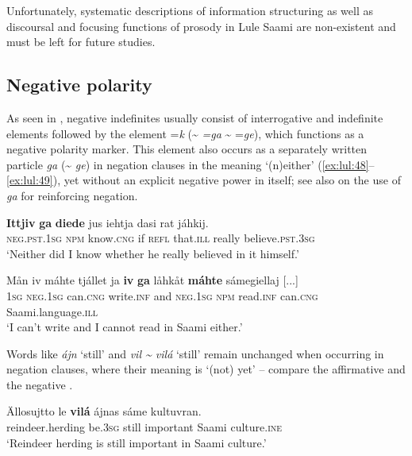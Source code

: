 \documentclass[output=paper,colorlinks,citecolor=brown]{langscibook}
\begin{document}
Unfortunately, systematic descriptions of information structuring as well as discoursal and focusing functions of prosody in Lule Saami are non-existent and must be left for future studies.

\subsection{Negative polarity} \label{sec:lul:4.2}
As seen in , negative indefinites usually consist of interrogative and indefinite elements followed by the element =\textit{k} ({\textasciitilde} \textit{=ga} {\textasciitilde} =\textit{ge}), which functions as a negative polarity marker. This element also occurs as a separately written particle \textit{ga} ({\textasciitilde} \textit{ge}) in negation clauses in the meaning ‘(n)either’ (\ref{ex:lul:48}--\ref{ex:lul:49}), yet without an explicit negative power in itself; see also  on the use of \textit{ga} for reinforcing negation.

\ea\label{ex:lul:48} 
    \gll \textbf{Ittjiv} \textbf{ga} \textbf{diede} jus iehtja dasi rat jáhkij. \\ 
         \textsc{neg.pst.1sg} \textsc{npm} know.\textsc{cng} if \textsc{refl} that\textsc{.ill} really believe.\textsc{pst.3sg} \\
    \glt ‘Neither did I know whether he really believed in it himself.’ \citep{SIKOR2021}
\z 

\ea\label{ex:lul:49} 
    \gll Mån iv máhte tjállet ja \textbf{iv} \textbf{ga} låhkåt \textbf{máhte} sámegiellaj [...]\\ 
         \textsc{1sg} \textsc{neg}.\textsc{1sg} can.\textsc{cng} write.\textsc{inf} and \textsc{neg}.\textsc{1sg} \textsc{npm} read.\textsc{inf} can.\textsc{cng} Saami.language.\textsc{ill}\\
    \glt ‘I can’t write and I cannot read in Saami either.’ \citep{SIKOR2021}
\z 

Words like \textit{ájn} ‘still’ and \textit{vil {\textasciitilde} vilá} ‘still’ remain unchanged when occurring in negation clauses, where their meaning is ‘(not) yet’ – compare the affirmative  and the negative .

\ea\label{ex:lul:50} 
    \gll Ällosujtto le \textbf{vilá} ájnas sáme kultuvran. \\ 
         reindeer.herding be.\textsc{3sg} still important Saami culture.\textsc{ine} \\
    \glt ‘Reindeer herding is still important in Saami culture.’ \citep{SIKOR2021}
\z 
\end{document}
